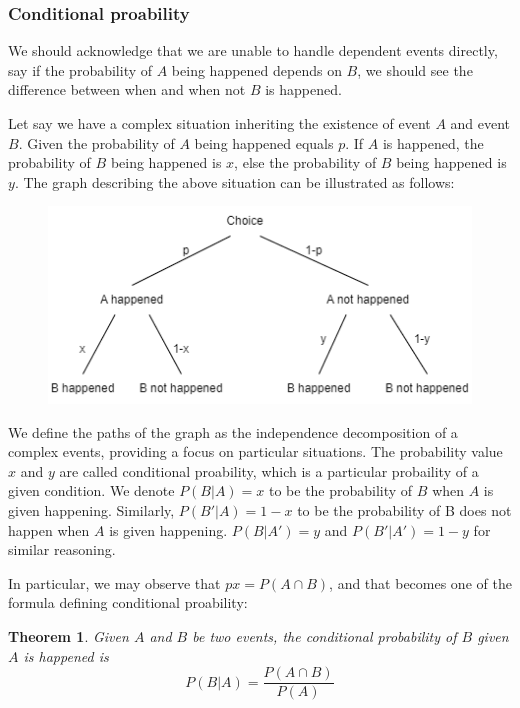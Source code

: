 \documentclass[12pt]{article}
\newtheorem*{theorem}{Theorem}
\begin{document}
    \subsubsection*{Conditional proability}

    We should acknowledge that we are unable to handle dependent events directly, say if the probability of $A$ being happened depends on $B$, we should see the difference between when and when not $B$ is happened. 

    Let say we have a complex situation inheriting the existence of event $A$ and event $B$. Given the probability of $A$ being happened equals $p$. If $A$ is happened, the probability of $B$ being happened is $x$, else the probability of $B$ being happened is $y$. The graph describing the above situation can be illustrated as follows:

    \begin{figure}[H]
        \centering
        \includegraphics[scale=0.8]{independence.png}
    \end{figure}

    We define the paths of the graph as the independence decomposition of a complex events, providing a focus on particular situations. The probability value $x$ and $y$ are called conditional proability, which is a particular probaility of a given condition. We denote $P(B|A)=x$ to be the probability of $B$ when $A$ is given happening. Similarly, $P(B'|A)=1-x$ to be the probability of B does not happen when $A$ is given happening. $P(B|A')=y$ and $P(B'|A')=1-y$ for similar reasoning.

    In particular, we may observe that $px=P(A\cap B)$, and that becomes one of the formula defining conditional proability:

    \begin{theorem}
        Given $A$ and $B$ be two events, the conditional probability of $B$ given $A$ is happened is \[P(B|A)=\frac{P(A\cap B)}{P(A)}\]
    \end{theorem}
\end{document}
